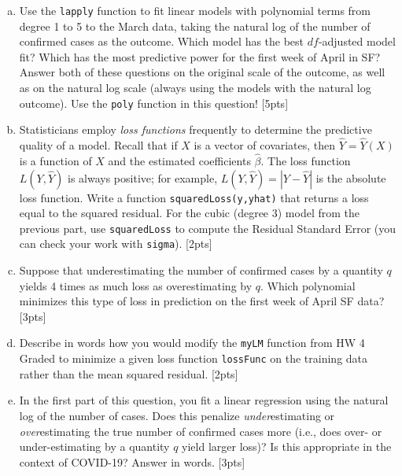 \documentclass[12pt]{article}
\begin{document}
\begin{enumerate}[(a)]
	\item Use the \verb|lapply| function to fit linear models with polynomial terms from degree 1 to 5 to the March data, taking the natural log of the number of confirmed cases as the outcome. Which model has the best $df$-adjusted model fit? Which has the most predictive power for the first week of April in SF? Answer both of these questions on the original scale of the outcome, as well as on the natural log scale (always using the models with the natural log outcome). Use the \verb|poly| function in this question! [5pts]
	\item Statisticians employ \textit{loss functions} frequently to determine the predictive quality of a model. Recall that if $X$ is a vector of covariates, then $\hat{Y} = \hat{Y}(X)$ is a function of $X$ and the estimated coefficients $\hat{\beta}$. The loss function $L(Y,\hat{Y})$ is always positive; for example, $L(Y,\hat{Y}) = |Y-\hat{Y}|$ is the absolute loss function. Write a function \verb|squaredLoss(y,yhat)| that returns a loss equal to the squared residual. For the cubic (degree 3) model from the previous part, use \verb|squaredLoss| to compute the Residual Standard Error (you can check your work with \verb|sigma|). [2pts]
	\item Suppose that underestimating the number of confirmed cases by a quantity $q$ yields 4 times as much loss as overestimating by $q$. Which polynomial minimizes this type of loss in prediction on the first week of April SF data? [3pts]
	\item Describe in words how you would modify the \verb|myLM| function from HW 4 Graded to minimize a given loss function \verb|lossFunc| on the training data rather than the mean squared residual. [2pts]
	\item In the first part of this question, you fit a linear regression using the natural log of the number of cases. Does this penalize \textit{under}estimating or \textit{over}estimating the true number of confirmed cases more (i.e., does over- or under-estimating by a quantity $q$ yield larger loss)? Is this appropriate in the context of COVID-19? Answer in words. [3pts]
\end{enumerate}
\end{document}
